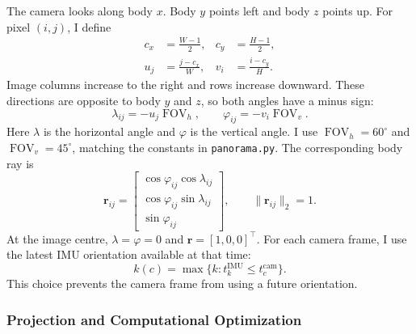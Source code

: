 \documentclass[letterpaper, 10pt, conference]{ieeeconf}
\newcommand{\dg}{^\circ}
\begin{document}
The camera looks along body $x$. Body $y$ points left and body $z$ points up.
For pixel $(i,j)$, I define
\begin{equation}
\begin{aligned}
c_x&=\frac{W-1}{2}, & c_y&=\frac{H-1}{2},\\
u_j&=\frac{j-c_x}{W}, & v_i&=\frac{i-c_y}{H}.
\end{aligned}
\end{equation}
Image columns increase to the right and rows increase downward. These directions
are opposite to body $y$ and $z$, so both angles have a minus sign:
\begin{equation}
\lambda_{ij}=-u_j\operatorname{FOV}_h,\qquad
\varphi_{ij}=-v_i\operatorname{FOV}_v.
\end{equation}
Here $\lambda$ is the horizontal angle and $\varphi$ is the vertical angle.
I use $\operatorname{FOV}_h=60\dg$ and $\operatorname{FOV}_v=45\dg$, matching
the constants in \texttt{panorama.py}. The corresponding body ray is
\begin{equation}
\mathbf r_{ij}=
\begin{bmatrix}
\cos\varphi_{ij}\cos\lambda_{ij}\\
\cos\varphi_{ij}\sin\lambda_{ij}\\
\sin\varphi_{ij}
\end{bmatrix},\qquad \|\mathbf r_{ij}\|_2=1.
\label{eq:ray}
\end{equation}
At the image centre, $\lambda=\varphi=0$ and
$\mathbf r=[1,0,0]^\top$. For each camera frame, I use the latest IMU
orientation available at that time:
\begin{equation}
k(c)=\max\{k:t_k^{\mathrm{IMU}}\leq t_c^{\mathrm{cam}}\}.
\label{eq:timealign}
\end{equation}
This choice prevents the camera frame from using a future orientation.

\subsubsection{Projection and Computational Optimization}
\end{document}
